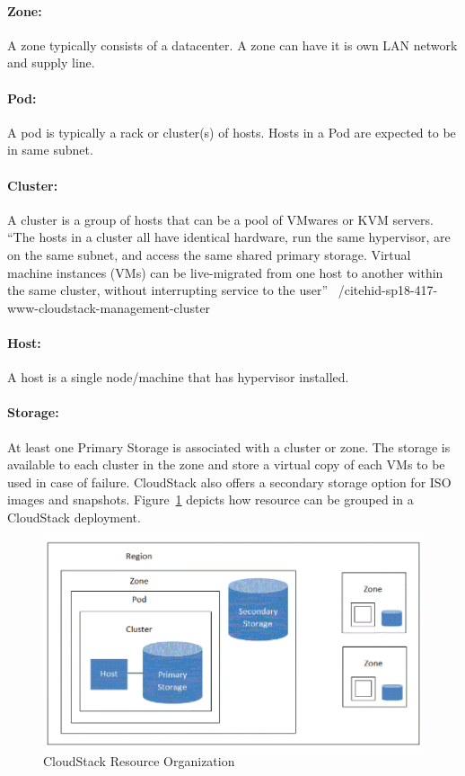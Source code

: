 \paragraph{Zone:}	A zone typically consists of a datacenter. A zone can have it is own LAN
network and supply line. 
\paragraph{Pod:}	A pod is typically a rack or cluster(s) of hosts. Hosts in a Pod are 
expected to be in same subnet. 
\paragraph{Cluster:} 	A cluster is a group of hosts that can be a pool of VMwares or KVM 
servers. ``The hosts in a cluster all have identical hardware, run the same 
hypervisor, are on the same subnet, and access the same shared primary storage.
Virtual machine instances (VMs) can be live-migrated from one host to another
within the same cluster, without
interrupting service to the user'' ~/cite{hid-sp18-417-www-cloudstack-management-cluster}
\paragraph{Host:}	A host is a single node/machine that has hypervisor installed.
\paragraph{Storage:}	At least one Primary Storage is associated with a cluster or zone. The 
storage is available to each cluster in the zone and store a virtual copy of 
each VMs to be used in case of failure. CloudStack also offers a secondary storage
option for ISO images and snapshots.
Figure~\ref{F:cloudstack-resource-group} depicts how resource can 
be grouped in a CloudStack deployment.

\begin{figure}[htb]
\includegraphics[width=\columnwidth]{images/hid-sp18-417-cloudstack.png}
\caption{CloudStack Resource Organization~\cite{hid-sp18-417-cloudstack-resource-grouping}}
\label{F:cloudstack-resource-group}
\end{figure}

